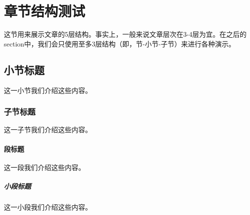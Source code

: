 \section{章节结构测试}这节用来展示文章的5层结构。事实上，一般来说文章层次在3-4层为宜。在之后的section中，我们会只使用至多3层结构（即，节-小节-子节）来进行各种演示。
 
\subsection{小节标题}这一小节我们介绍这些内容。

\subsubsection{子节标题}这一子节我们介绍这些内容。

\paragraph{段标题}


这一段我们介绍这些内容。 

\subparagraph{小段标题}这一小段我们介绍这些内容。
